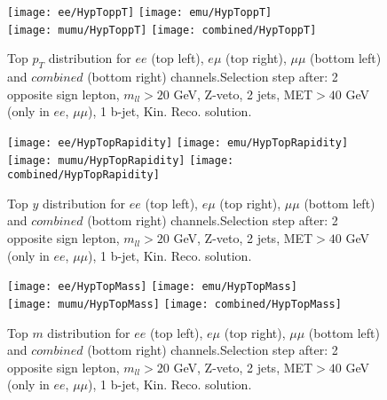 \documentclass[12pt, a4paper, titlepage]{article}
\begin{document}
\clearpage
\newpage



\begin{figure}
  \texttt{[image: ee/HypToppT]}
  \texttt{[image: emu/HypToppT]}\\
  \texttt{[image: mumu/HypToppT]}
  \texttt{[image: combined/HypToppT]}
\caption{Top $p_T$ distribution for $ee$ (top left), $e\mu$ (top right), $\mu\mu$ (bottom left) and $combined$ (bottom right) channels.\newline Selection step after: 2 opposite sign lepton, $m_{ll}>20$ GeV, Z-veto, 2 jets, MET$>40$ GeV (only in $ee$, $\mu\mu$), 1 b-jet, Kin. Reco. solution.}
\end{figure}

\clearpage
\newpage

\begin{figure}
  \texttt{[image: ee/HypTopRapidity]}
  \texttt{[image: emu/HypTopRapidity]}\\
  \texttt{[image: mumu/HypTopRapidity]}
  \texttt{[image: combined/HypTopRapidity]}
\caption{Top $y$ distribution for $ee$ (top left), $e\mu$ (top right), $\mu\mu$ (bottom left) and $combined$ (bottom right) channels.\newline Selection step after: 2 opposite sign lepton, $m_{ll}>20$ GeV, Z-veto, 2 jets, MET$>40$ GeV (only in $ee$, $\mu\mu$), 1 b-jet, Kin. Reco. solution.}
\end{figure}

\clearpage
\newpage


\begin{figure}
  \texttt{[image: ee/HypTopMass]}
  \texttt{[image: emu/HypTopMass]}\\
  \texttt{[image: mumu/HypTopMass]}
  \texttt{[image: combined/HypTopMass]}
\caption{Top $m$ distribution for $ee$ (top left), $e\mu$ (top right), $\mu\mu$ (bottom left) and $combined$ (bottom right) channels.\newline Selection step after: 2 opposite sign lepton, $m_{ll}>20$ GeV, Z-veto, 2 jets, MET$>40$ GeV (only in $ee$, $\mu\mu$), 1 b-jet, Kin. Reco. solution.}
\end{figure}
\end{document}
